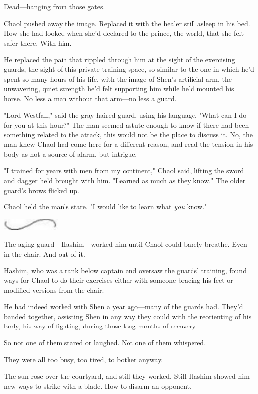 Dead---hanging from those gates.

Chaol pushed away the image. Replaced it with the healer still asleep in his bed. How she had looked when she'd declared to the prince, the world, that she felt safer there. With him.

He replaced the pain that rippled through him at the sight of the exercising guards, the sight of this private training space, so similar to the one in which he'd spent so many hours of his life, with the image of Shen's artificial arm, the unwavering, quiet strength he'd felt supporting him while he'd mounted his horse. No less a man without that arm---no less a guard.

"Lord Westfall," said the gray-haired guard, using his language. "What can I do for you at this hour?" The man seemed astute enough to know if there had been something related to the attack, this would not be the place to discuss it. No, the man knew Chaol had come here for a different reason, and read the tension in his body as not a source of alarm, but intrigue.

"I trained for years with men from my continent," Chaol said, lifting the sword and dagger he'd brought with him. "Learned as much as they know." The older guard's brows flicked up.

Chaol held the man's stare. "I would like to learn what \emph{you}
know."

\includegraphics[width=1.12in,height=0.24in]{images/seperator}

The aging guard---Hashim---worked him until Chaol could barely breathe. Even in the chair. And out of it.

Hashim, who was a rank below captain and oversaw the guards' training, found ways for Chaol to do their exercises either with someone bracing his feet or modified versions from the chair.

He had indeed worked with Shen a year ago---many of the guards had. They'd banded together, assisting Shen in any way they could with the reorienting of his body, his way of fighting, during those long months of recovery.

So not one of them stared or laughed. Not one of them whispered.

They were all too busy, too tired, to bother anyway.

The sun rose over the courtyard, and still they worked. Still Hashim showed him new ways to strike with a blade. How to disarm an opponent.

